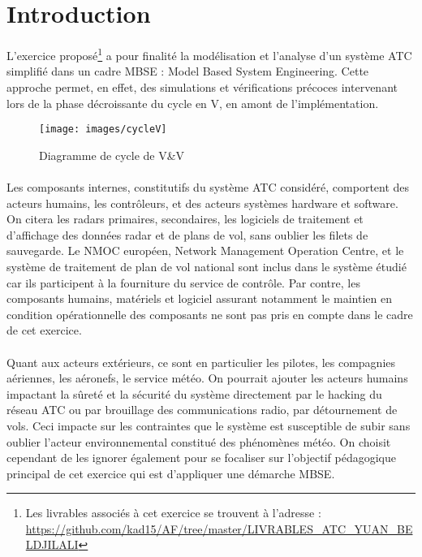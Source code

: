 
\pagebreak

\section*{Introduction}



L'exercice proposé\footnote{Les livrables associés à cet exercice se trouvent à l'adresse : 
	\url{https://github.com/kad15/AF/tree/master/LIVRABLES_ATC_YUAN_BELDJILALI}} a pour finalité la modélisation et l'analyse d'un système ATC simplifié dans un cadre MBSE : Model Based System Engineering. Cette approche permet, en effet, des simulations et vérifications précoces intervenant lors de la phase décroissante du cycle en V, en amont de l'implémentation.   

\begin{figure}[H]
	\begin{center}	
		\texttt{[image: images/cycleV]}
		\caption{Diagramme de cycle de V\&V}
		\label{cycleV}
	\end{center}
\end{figure}

\paragraph{}
Les composants internes, constitutifs du système ATC considéré, comportent des acteurs humains, les contrôleurs, et des acteurs systèmes hardware et software. On citera les radars primaires, secondaires, les logiciels de traitement et d'affichage des données radar et de plans de vol, sans oublier les filets de sauvegarde. Le NMOC européen, Network Management Operation Centre, et le système de traitement de plan de vol national sont inclus dans le système étudié car ils participent à la fourniture du service de contrôle. Par contre, les composants humains, matériels et logiciel assurant notamment le maintien en condition opérationnelle des composants ne sont pas pris en compte dans le cadre de cet exercice.
\paragraph{}
Quant aux acteurs extérieurs, ce sont en particulier les pilotes, les compagnies aériennes, les aéronefs, le service météo. On pourrait ajouter les acteurs humains impactant la sûreté et la sécurité du système directement par le hacking du réseau ATC ou par brouillage des communications radio, par détournement de vols. Ceci impacte sur les contraintes que le système est susceptible de subir sans oublier l'acteur environnemental constitué des phénomènes météo. On choisit cependant de les ignorer également pour se focaliser sur l'objectif pédagogique principal de cet exercice qui est d'appliquer une démarche MBSE.







